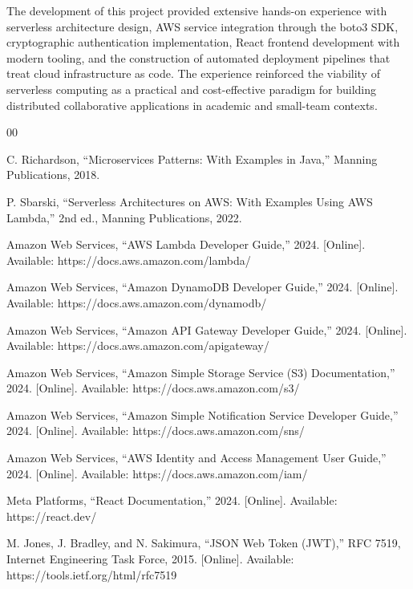 \documentclass[conference]{IEEEtran}
\begin{document}
The development of this project provided extensive hands-on experience with serverless architecture design, AWS service integration through the boto3 SDK, cryptographic authentication implementation, React frontend development with modern tooling, and the construction of automated deployment pipelines that treat cloud infrastructure as code. The experience reinforced the viability of serverless computing as a practical and cost-effective paradigm for building distributed collaborative applications in academic and small-team contexts.

\begin{thebibliography}{00}

 C. Richardson, ``Microservices Patterns: With Examples in Java,'' Manning Publications, 2018.

 P. Sbarski, ``Serverless Architectures on AWS: With Examples Using AWS Lambda,'' 2nd ed., Manning Publications, 2022.

 Amazon Web Services, ``AWS Lambda Developer Guide,'' 2024. [Online]. Available: https://docs.aws.amazon.com/lambda/

 Amazon Web Services, ``Amazon DynamoDB Developer Guide,'' 2024. [Online]. Available: https://docs.aws.amazon.com/dynamodb/

 Amazon Web Services, ``Amazon API Gateway Developer Guide,'' 2024. [Online]. Available: https://docs.aws.amazon.com/apigateway/

 Amazon Web Services, ``Amazon Simple Storage Service (S3) Documentation,'' 2024. [Online]. Available: https://docs.aws.amazon.com/s3/

 Amazon Web Services, ``Amazon Simple Notification Service Developer Guide,'' 2024. [Online]. Available: https://docs.aws.amazon.com/sns/

 Amazon Web Services, ``AWS Identity and Access Management User Guide,'' 2024. [Online]. Available: https://docs.aws.amazon.com/iam/

 Meta Platforms, ``React Documentation,'' 2024. [Online]. Available: https://react.dev/

 M. Jones, J. Bradley, and N. Sakimura, ``JSON Web Token (JWT),'' RFC 7519, Internet Engineering Task Force, 2015. [Online]. Available: https://tools.ietf.org/html/rfc7519

\end{thebibliography}
\end{document}
